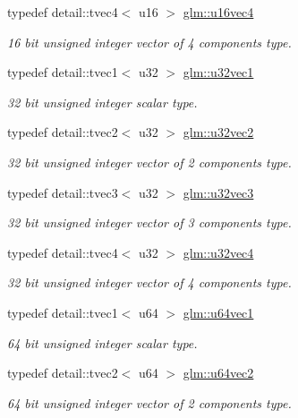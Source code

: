 \begin{DoxyCompactItemize}
typedef detail\-::tvec4$<$ u16 $>$ \hyperlink{group__gtc__type__precision_ga0144c89f52e4b5ca057f5349cdd80bf2}{glm\-::u16vec4}
\begin{DoxyCompactList}\small\item\em 16 bit unsigned integer vector of 4 components type. \end{DoxyCompactList}\item 
typedef detail\-::tvec1$<$ u32 $>$ \hyperlink{group__gtc__type__precision_ga690033f989275bb90f793a785dc45521}{glm\-::u32vec1}
\begin{DoxyCompactList}\small\item\em 32 bit unsigned integer scalar type. \end{DoxyCompactList}\item 
typedef detail\-::tvec2$<$ u32 $>$ \hyperlink{group__gtc__type__precision_ga6cad9c800c714098d4adc0ee7746b48c}{glm\-::u32vec2}
\begin{DoxyCompactList}\small\item\em 32 bit unsigned integer vector of 2 components type. \end{DoxyCompactList}\item 
typedef detail\-::tvec3$<$ u32 $>$ \hyperlink{group__gtc__type__precision_gac56c189cd9527b002389e43076f30805}{glm\-::u32vec3}
\begin{DoxyCompactList}\small\item\em 32 bit unsigned integer vector of 3 components type. \end{DoxyCompactList}\item 
typedef detail\-::tvec4$<$ u32 $>$ \hyperlink{group__gtc__type__precision_ga5cd7923918307032d87d7d5ce0257c15}{glm\-::u32vec4}
\begin{DoxyCompactList}\small\item\em 32 bit unsigned integer vector of 4 components type. \end{DoxyCompactList}\item 
typedef detail\-::tvec1$<$ u64 $>$ \hyperlink{group__gtc__type__precision_ga8a4606421d8f5a874a21bc31346103cb}{glm\-::u64vec1}
\begin{DoxyCompactList}\small\item\em 64 bit unsigned integer scalar type. \end{DoxyCompactList}\item 
typedef detail\-::tvec2$<$ u64 $>$ \hyperlink{group__gtc__type__precision_gad17df8c10793777ec3081fc40b801935}{glm\-::u64vec2}
\begin{DoxyCompactList}\small\item\em 64 bit unsigned integer vector of 2 components type. \end{DoxyCompactList}\item 

\end{DoxyCompactItemize}
